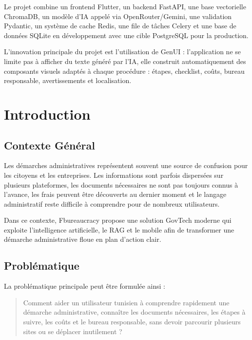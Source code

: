 \documentclass[12pt,a4paper]{report}
\begin{document}
Le projet combine un frontend Flutter, un backend FastAPI, une base vectorielle ChromaDB, un modèle d'IA appelé via OpenRouter/Gemini, une validation Pydantic, un système de cache Redis, une file de tâches Celery et une base de données SQLite en développement avec une cible PostgreSQL pour la production.

L'innovation principale du projet est l'utilisation de GenUI : l'application ne se limite pas à afficher du texte généré par l'IA, elle construit automatiquement des composants visuels adaptés à chaque procédure : étapes, checklist, coûts, bureau responsable, avertissements et localisation.


\chapter{Introduction}

\section{Contexte Général}

Les démarches administratives représentent souvent une source de confusion pour les citoyens et les entreprises. Les informations sont parfois dispersées sur plusieurs plateformes, les documents nécessaires ne sont pas toujours connus à l'avance, les frais peuvent être découverts au dernier moment et le langage administratif reste difficile à comprendre pour de nombreux utilisateurs.

Dans ce contexte, Fbureaucracy propose une solution GovTech moderne qui exploite l'intelligence artificielle, le RAG et le mobile afin de transformer une démarche administrative floue en plan d'action clair.

\section{Problématique}

La problématique principale peut être formulée ainsi :

\begin{quote}
Comment aider un utilisateur tunisien à comprendre rapidement une démarche administrative, connaître les documents nécessaires, les étapes à suivre, les coûts et le bureau responsable, sans devoir parcourir plusieurs sites ou se déplacer inutilement ?
\end{quote}
\end{document}
